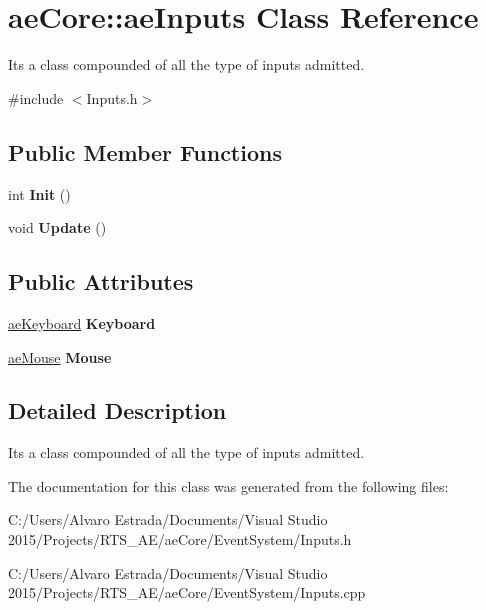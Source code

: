 \hypertarget{structae_core_1_1ae_inputs}{}\section{ae\+Core\+:\+:ae\+Inputs Class Reference}
\label{structae_core_1_1ae_inputs}


It\textquotesingle{}s a class compounded of all the type of inputs admitted.  




{\ttfamily \#include $<$Inputs.\+h$>$}

\subsection*{Public Member Functions}
\begin{DoxyCompactItemize}
\item 
int {\bfseries Init} ()\hypertarget{structae_core_1_1ae_inputs_a6e5a34a96a504703797f4e6046d5fe78}{}\label{structae_core_1_1ae_inputs_a6e5a34a96a504703797f4e6046d5fe78}

\item 
void {\bfseries Update} ()\hypertarget{structae_core_1_1ae_inputs_aab43c15f6e2503872f4b898b486c8e72}{}\label{structae_core_1_1ae_inputs_aab43c15f6e2503872f4b898b486c8e72}

\end{DoxyCompactItemize}
\subsection*{Public Attributes}
\begin{DoxyCompactItemize}
\item 
\hyperlink{classae_core_1_1ae_keyboard}{ae\+Keyboard} {\bfseries Keyboard}\hypertarget{structae_core_1_1ae_inputs_a5b0ac77afe82cec2a50ea4bb24426d27}{}\label{structae_core_1_1ae_inputs_a5b0ac77afe82cec2a50ea4bb24426d27}

\item 
\hyperlink{classae_core_1_1ae_mouse}{ae\+Mouse} {\bfseries Mouse}\hypertarget{structae_core_1_1ae_inputs_a7320366cc9b04bae5f956fa749ab9e43}{}\label{structae_core_1_1ae_inputs_a7320366cc9b04bae5f956fa749ab9e43}

\end{DoxyCompactItemize}


\subsection{Detailed Description}
It\textquotesingle{}s a class compounded of all the type of inputs admitted. 

The documentation for this class was generated from the following files\+:\begin{DoxyCompactItemize}
\item 
C\+:/\+Users/\+Alvaro Estrada/\+Documents/\+Visual Studio 2015/\+Projects/\+R\+T\+S\+\_\+\+A\+E/ae\+Core/\+Event\+System/Inputs.\+h\item 
C\+:/\+Users/\+Alvaro Estrada/\+Documents/\+Visual Studio 2015/\+Projects/\+R\+T\+S\+\_\+\+A\+E/ae\+Core/\+Event\+System/Inputs.\+cpp\end{DoxyCompactItemize}
